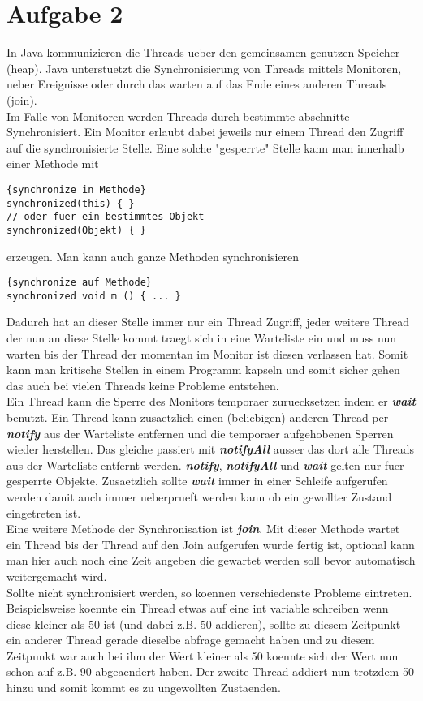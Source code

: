 \documentclass[12pt]{scrartcl}
\begin{document}
\section*{Aufgabe 2}
In Java kommunizieren die Threads ueber den gemeinsamen genutzen Speicher (heap).
Java unterstuetzt die Synchronisierung von Threads mittels Monitoren, ueber Ereignisse 
oder durch das warten auf das Ende eines anderen Threads (join).
\\
Im Falle von Monitoren werden Threads durch bestimmte abschnitte Synchronisiert. Ein 
Monitor erlaubt dabei jeweils nur einem Thread den Zugriff auf die synchronisierte Stelle. 
Eine solche "gesperrte" Stelle kann man innerhalb einer Methode mit

\begin{lstlisting}{synchronize in Methode}
synchronized(this) { }
// oder fuer ein bestimmtes Objekt
synchronized(Objekt) { }
\end{lstlisting}

erzeugen. Man kann auch ganze Methoden synchronisieren

\begin{lstlisting}{synchronize auf Methode}
synchronized void m () { ... }
\end{lstlisting}

Dadurch hat an dieser Stelle immer nur ein Thread Zugriff, jeder weitere Thread der nun an 
diese Stelle kommt traegt sich in eine Warteliste ein und muss nun warten bis der Thread der 
momentan im Monitor ist diesen verlassen hat. Somit kann man kritische Stellen in einem Programm 
kapseln und somit sicher gehen das auch bei vielen Threads keine Probleme entstehen.
\\
Ein Thread kann die Sperre des Monitors temporaer zuruecksetzen indem er \textbf{\textit{wait}} 
benutzt. Ein Thread kann zusaetzlich einen (beliebigen) anderen Thread per \textbf{\textit{notify}} 
aus der Warteliste entfernen und die temporaer aufgehobenen Sperren wieder herstellen. Das gleiche 
passiert mit \textbf{\textit{notifyAll}} ausser das dort alle Threads aus der Warteliste entfernt werden. 
\textbf{\textit{notify}}, \textbf{\textit{notifyAll}} und \textbf{\textit{wait}} gelten nur fuer 
gesperrte Objekte. Zusaetzlich sollte \textbf{\textit{wait}} immer in einer Schleife aufgerufen werden 
damit auch immer ueberprueft werden kann ob ein gewollter Zustand eingetreten ist.
\\
Eine weitere Methode der Synchronisation ist \textbf{\textit{join}}. Mit dieser Methode wartet ein Thread 
bis der Thread auf den Join aufgerufen wurde fertig ist, optional kann man hier auch noch eine Zeit angeben 
die gewartet werden soll bevor automatisch weitergemacht wird.
\\
Sollte nicht synchronisiert werden, so koennen verschiedenste Probleme eintreten. Beispielsweise koennte 
ein Thread etwas auf eine int variable schreiben wenn diese kleiner als 50 ist (und dabei z.B. 50 addieren), 
sollte zu diesem Zeitpunkt ein anderer Thread gerade dieselbe abfrage gemacht haben und zu diesem Zeitpunkt war 
auch bei ihm der Wert kleiner als 50 koennte sich der Wert nun schon auf z.B. 90 abgeaendert haben. Der zweite 
Thread addiert nun trotzdem 50 hinzu und somit kommt es zu ungewollten Zustaenden.
\end{document}
